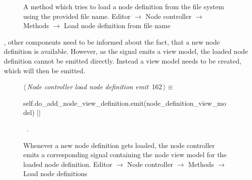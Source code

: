 \documentclass[%
    a4paper,    %
    justified,  %
    nobib,      %
    openany     %
]{tufte-book}
\makeatletter
\renewcommand{\label}[1]{\@tufte@label{##1}}%
\makeatother
\begin{document}
\begin{figure}[!htbp]
\begin{flushleft}
\begin{minipage}{\linewidth}
\begin{list}{}{\setlength{\itemsep}{-\parsep}\setlength{\itemindent}{-\leftmargin}}
\item{}
\end{list}
\end{minipage}\vspace{4ex}
\end{flushleft}
\caption{A method which tries to load a node definition from the
  file system using the provided file name.
  \newline{}\newline{}Editor $\rightarrow$ Node controller $\rightarrow$
  Methods $\rightarrow$ Load node definition from file name}
\end{figure}

, other components need
to be informed about the fact, that a new node definition is available. However,
as the signal emits a view model, the loaded node definition cannot be emitted
directly. Instead a view model needs to be created, which will then be emitted.

\begin{figure}[!htbp]
\begin{flushleft} \small
\begin{minipage}{\linewidth}\label{scrap124}\raggedright\small
{} $\langle\,${\itshape Node controller load node definition emit}\nobreak\ {\footnotesize {162}}$\,\rangle\equiv$
\vspace{-1ex}
\begin{pythoncode}
self.do_add_node_view_definition.emit(node_definition_view_model)
|\NWsep|
\end{pythoncode}
\vspace{1.5ex}
\footnotesize
\begin{list}{}{\setlength{\itemsep}{-\parsep}\setlength{\itemindent}{-\leftmargin}}
\item \NWtxtMacroRefIn\ .

\item{}
\end{list}
\end{minipage}\vspace{4ex}
\end{flushleft}
\caption{Whenever a new node definition gets loaded, the node controller emits a
  corresponding signal containing the node view model for the loaded node definition.
  \newline{}\newline{}Editor $\rightarrow$ Node controller $\rightarrow$
  Methods $\rightarrow$ Load node definitions}
\end{figure}
\end{document}
